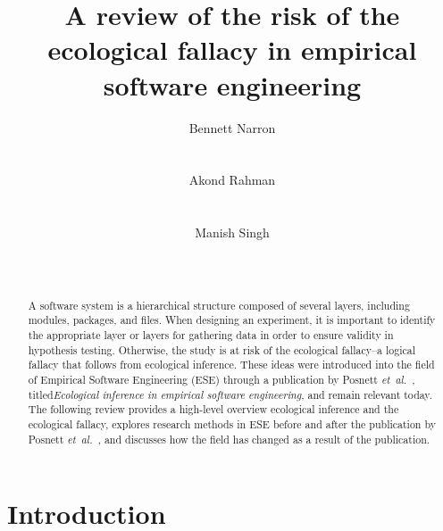 \documentclass{sig-alternate-05-2015}
\newcommand{\etal}{\mbox{\emph{et al.\ }}}
\begin{document}
    
\title{A review of the risk of the ecological fallacy in empirical software engineering}


\author{
\alignauthor
Bennett Narron\\
       \\
       \\
\alignauthor
Akond Rahman\\
       \\
       \\
\alignauthor
Manish Singh\\
       \\
       \\
}

\maketitle

\begin{abstract}
A software system is a hierarchical structure composed of several layers, including modules, packages, and files.  When designing an experiment, it is important to identify the appropriate layer or layers for gathering data in order to ensure validity in hypothesis testing.  Otherwise, the study is at risk of the ecological fallacy--a logical fallacy that follows from ecological inference.  These ideas were introduced into the field of Empirical Software Engineering (ESE) through a publication by Posnett \etal, titled\emph{Ecological inference in empirical software engineering}, and remain relevant today.  The following review provides a high-level overview ecological inference and the ecological fallacy, explores research methods in ESE before and after the publication by Posnett \etal, and discusses how the field has changed as a result of the publication.
\end{abstract}


\section{Introduction}
\end{document}
